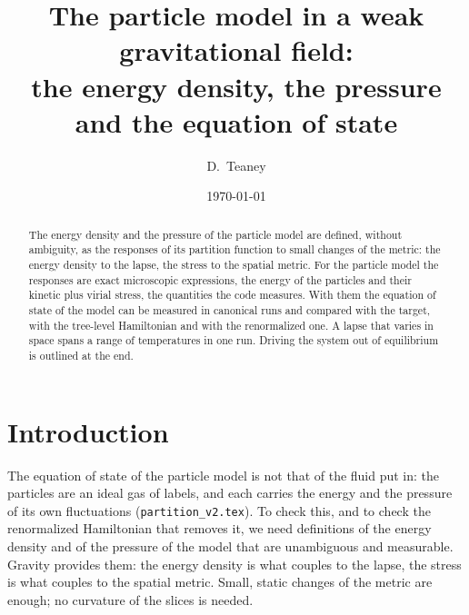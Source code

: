 \documentclass[11pt,aps,preprint,nofootinbib,superscriptaddress,tightenlines]{revtex4-2}
\begin{document}
\title{The particle model in a weak gravitational field:\\ the energy density, the pressure and the equation of state}
\author{D.~Teaney}
\date{\today}

\begin{abstract}
The energy density and the pressure of the particle model are defined, without ambiguity, as the responses of its partition function to small changes of the
metric: the energy density to the lapse, the stress to the spatial metric.  For the particle model the responses are exact microscopic expressions, the energy of
the particles and their kinetic plus virial stress, the quantities the code measures.  With them the equation of state of the model can be measured in canonical
runs and compared with the target, with the tree-level Hamiltonian and with the renormalized one.  A lapse that varies in space spans a range of temperatures in one
run.  Driving the system out of equilibrium is outlined at the end.
\end{abstract}

\maketitle
\tableofcontents

\section{Introduction}
\label{sec:intro}

The equation of state of the particle model is not that of the fluid put in: the particles are an ideal gas of labels, and each carries the energy and the pressure
of its own fluctuations (\texttt{partition\_v2.tex}).  To check this, and to check the renormalized Hamiltonian that removes it, we need definitions of the energy
density and of the pressure of the model that are unambiguous and measurable.  Gravity provides them: the energy density is what couples to the lapse, the stress is
what couples to the spatial metric.  Small, static changes of the metric are enough; no curvature of the slices is needed.
\end{document}
